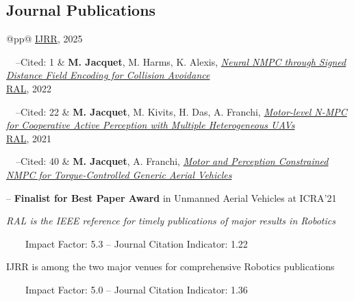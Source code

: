 \documentclass[11pt,a4paper]{article}
\newlength{\colone}
\newlength{\coltwo}
\newcommand{\cited}[1]{\par\footnotesize{~~--Cited: #1}}
\newcommand{\notes}[1]{{\small\color{gray}\itshape #1}}
\newcommand{\me}{{\bfseries M. Jacquet}}
\begin{document}
\subsection{Journal Publications}
\begin{longtable}{@{}p{\colone}p{\coltwo}@{}}
	\href{https://www.scimagojr.com/journalsearch.php?q=18050&tip=sid}{IJRR}, 2025 \cited{1}
	& \me, M. Harms, K. Alexis, \href{https://doi.org/10.1177/02783649251401223}{\itshape Neural NMPC through Signed Distance Field Encoding for Collision Avoidance}
\\
	\href{https://www.scimagojr.com/journalsearch.php?q=21100900379&tip=sid}{RAL}, 2022 \cited{22}
	& \me, M. Kivits, H. Das, A. Franchi, \href{https://doi.org/10.1109/LRA.2022.3143218}{\itshape Motor-level N-MPC for Cooperative Active Perception with Multiple Heterogeneous UAVs}
\\
	\href{https://www.scimagojr.com/journalsearch.php?q=21100900379&tip=sid}{RAL}, 2021 \cited{40}
	& \me, A. Franchi, \href{https://doi.org/10.1109/LRA.2020.3045654}{\itshape Motor and Perception Constrained NMPC for Torque-Controlled Generic Aerial Vehicles} \par
		-- {\small{\bfseries Finalist for Best Paper Award} in Unmanned Aerial Vehicles at ICRA'21}
\end{longtable}
\notes{
	RAL is the IEEE reference for timely publications of major results in Robotics \par
	~~~~Impact Factor: 5.3 -- Journal Citation Indicator: 1.22 \par
	IJRR is among the two major venues for comprehensive Robotics publications \par
	~~~~Impact Factor: 5.0 -- Journal Citation Indicator: 1.36
}
%
\end{document}
